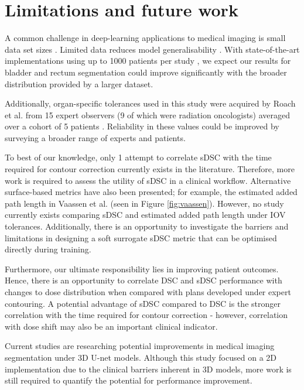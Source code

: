 

\section{Limitations and future work}

A common challenge in deep-learning applications to medical imaging is small data set sizes \cite{Ronneberger_2015}. Limited data reduces model generalisability \cite{Shen2017}. With state-of-the-art implementations using up to 1000 patients per study \cite{Nikolov_2018}, we expect our results for bladder and rectum segmentation could improve significantly with the broader distribution provided by a larger dataset.

Additionally, organ-specific tolerances used in this study were acquired by Roach et al. from 15 expert observers (9 of which were radiation oncologists) averaged over a cohort of 5 patients \cite{Roach_2019}. Reliability in these values could be improved by surveying a broader range of experts and patients.

To best of our knowledge, only 1 attempt to correlate sDSC with the time required for contour correction currently exists in the literature. Therefore, more work is required to assess the utility of sDSC in a clinical workflow. Alternative surface-based metrics have also been presented; for example, the estimated added path length in Vaassen et al. (seen in Figure \ref{fig:vaassen}). However, no study currently exists comparing sDSC and estimated added path length under IOV tolerances. Additionally, there is an opportunity to investigate the barriers and limitations in designing a soft surrogate sDSC metric that can be optimised directly during training.

Furthermore, our ultimate responsibility lies in improving patient outcomes. Hence, there is an opportunity to correlate DSC and sDSC performance with changes to dose distribution when compared with plans developed under expert contouring. A potential advantage of sDSC compared to DSC is the stronger correlation with the time required for contour correction - however, correlation with dose shift may also be an important clinical indicator.

Current studies are researching potential improvements in medical imaging segmentation under 3D U-net models. Although this study focused on a 2D implementation due to the clinical barriers inherent in 3D models, more work is still required to quantify the potential for performance improvement. 

